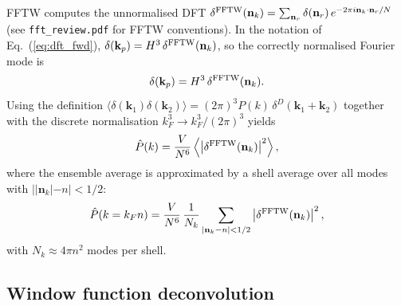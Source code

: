 \documentclass[12pt]{article}
\newcommand{\bk}{\mathbf{k}}
\begin{document}
FFTW computes the unnormalised DFT
$\delta^{\rm FFTW}(\mathbf{n}_k) = \sum_{\mathbf{n}_r}
\delta(\mathbf{n}_r)\,e^{-2\pi i\mathbf{n}_k\cdot\mathbf{n}_r/N}$
(see \texttt{fft\_review.pdf} for FFTW conventions).  In the notation of
Eq.~(\ref{eq:dft_fwd}), $\delta(\bk_p) = H^3\,\delta^{\rm FFTW}(\mathbf{n}_k)$,
so the correctly normalised Fourier mode is
%
\begin{equation}
  \delta(\bk_p) = H^3\,\delta^{\rm FFTW}(\mathbf{n}_k).
  \label{eq:delta_norm}
\end{equation}
%
Using the definition $\langle\delta(\bk_1)\delta(\bk_2)\rangle =
(2\pi)^3 P(k)\,\delta^D(\bk_1+\bk_2)$ together with the discrete
normalisation $k_F^3 \to k_F^3/(2\pi)^3$ yields \citep{Jeong2010}
%
\begin{equation}
  \hat{P}(k) = \frac{V}{N^6}
    \left\langle\left|\delta^{\rm FFTW}(\mathbf{n}_k)\right|^2\right\rangle,
  \label{eq:Pk_est}
\end{equation}
%
where the ensemble average is approximated by a shell average over all
modes with $||\mathbf{n}_k| - n| < 1/2$:
%
\begin{equation}
  \hat{P}(k = k_F n) = \frac{V}{N^6}\,\frac{1}{N_k}
    \sum_{|\mathbf{n}_k - n| < 1/2}
    \left|\delta^{\rm FFTW}(\mathbf{n}_k)\right|^2,
  \label{eq:Pk_shell}
\end{equation}
%
with $N_k \approx 4\pi n^2$ modes per shell.

\subsection{Window function deconvolution}
\label{app:pk_deconv}
\end{document}
